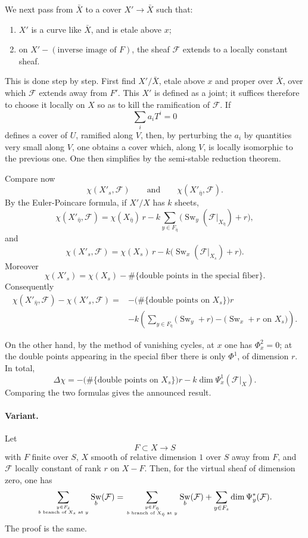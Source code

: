 \documentclass[11pt]{article}
\newcommand{\F}{\mathcal F}
\DeclareMathOperator{\Sw}{Sw}
\begin{document}
We next pass from \(\bar X\) to a cover \(X'\to\bar X\) such that:
\begin{enumerate}[label=\alph*)]
\item \(X'\) is a curve like \(\bar X\), and is etale above \(x\);
\item on \(X'-(\text{inverse image of }F)\), the sheaf \(\F\) extends to a locally constant sheaf.
\end{enumerate}

This is done step by step. First find \(X'/\bar X\), etale above \(x\) and proper over \(\bar X\), over which \(\F\) extends away from \(F'\). This \(X'\) is defined as a joint; it suffices therefore to choose it locally on \(X\) so as to kill the ramification of \(\F\). If
\[
  \sum_i a_i T^i=0
\]
defines a cover of \(U\), ramified along \(V\), then, by perturbing the \(a_i\) by quantities very small along \(V\), one obtains a cover which, along \(V\), is locally isomorphic to the previous one. One then simplifies by the semi-stable reduction theorem.

Compare now
\[
  \chi(X'_s,\F)\qquad\text{and}\qquad \chi(X'_{\bar\eta},\F).
\]
By the Euler-Poincare formula, if \(X'/X\) has \(k\) sheets,
\[
 \chi(X'_{\bar\eta},\F)
 =\chi(X_{\bar\eta})\,r
 -k\sum_{y\in F_{\bar\eta}}
   \bigl(\Sw_y(\F|_{X_{\bar\eta}})+r\bigr),
\]
and
\[
 \chi(X'_s,\F)
 =\chi(X_s)\,r
 -k\bigl(\Sw_x(\F|_{X_s})+r\bigr).
\]
Moreover
\[
  \chi(X'_s)=\chi(X_s)-
  \#\{\text{double points in the special fiber}\}.
\]
Consequently
\[
\begin{aligned}
\chi(X'_{\bar\eta},\F)-\chi(X'_s,\F)
={}&-\bigl(\#\{\text{double points on }X_s\}\bigr)r \\
&-k\left(
 \sum_{y\in F_{\bar\eta}}
 \bigl(\Sw_y+r\bigr)
 -\bigl(\Sw_x+r\text{ on }X_s\bigr)
\right).
\end{aligned}
\]

On the other hand, by the method of vanishing cycles, at \(x\) one has \(\Phi_x^2=0\); at the double points appearing in the special fiber there is only \(\Phi^1\), of dimension \(r\). In total,
\[
  \Delta\chi
  =-\bigl(\#\{\text{double points on }X_s\}\bigr)r
   -k\dim \Psi_x^1(\F|_X).
\]
Comparing the two formulas gives the announced result.

\paragraph{Variant.}
Let
\[
  F\subset X\longrightarrow S
\]
with \(F\) finite over \(S\), \(X\) smooth of relative dimension \(1\) over \(S\) away from \(F\), and \(\F\) locally constant of rank \(r\) on \(X-F\). Then, for the virtual sheaf of dimension zero, one has
\[
\sum_{y\in F_{\bar s}\atop b\text{ branch of }X_s\text{ at }y}
\Sw_b(\F)
=
\sum_{y\in F_{\bar\eta}\atop b\text{ branch of }X_{\bar\eta}\text{ at }y}
\Sw_b(\F)
+
\sum_{y\in F_s}\dim \Psi_y^*(\F).
\]
The proof is the same.
\end{document}
